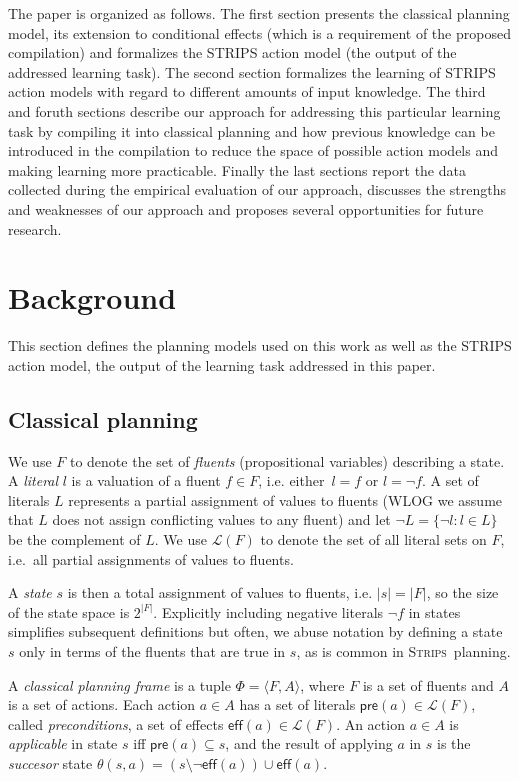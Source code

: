 \documentclass[letterpaper]{article} %
\newcommand{\tup}[1]{{\langle #1 \rangle}}
\newcommand{\pre}{\mathsf{pre}}     %
\newcommand{\eff}{\mathsf{eff}}     %
\newcommand{\strips}{\textsc{Strips}}     %
\begin{document}
The paper is organized as follows. The first section presents the classical planning model, its extension to conditional effects (which is a requirement of the proposed compilation) and formalizes the STRIPS action model (the output of the addressed learning task). The second section formalizes the learning of STRIPS action models with regard to different amounts of input knowledge. The third and foruth sections describe our approach for addressing this particular learning task by compiling it into classical planning and how previous knowledge can be introduced in the compilation to reduce the space of possible action models and making learning more practicable. Finally the last sections report the data collected during the empirical evaluation of our approach, discusses the strengths and weaknesses of our approach and proposes several opportunities for future research. 
 

\section{Background}
This section defines the planning models used on this work as well as the STRIPS action model, the output of the learning task addressed in this paper.

\subsection{Classical planning}
We use $F$ to denote the set of {\em fluents} (propositional variables) describing a state. A {\em literal} $l$ is a valuation of a fluent $f\in F$, i.e. either~$l=f$ or $l=\neg f$. A set of literals $L$ represents a partial assignment of values to fluents (WLOG we assume that $L$ does not assign conflicting values to any fluent) and let $\neg L=\{\neg l:l\in L\}$ be the complement of $L$. We use $\mathcal{L}(F)$ to denote the set of all literal sets on $F$, i.e.~all partial assignments of values to fluents.

A {\em state} $s$ is then a total assignment of values to fluents, i.e. $|s|=|F|$, so the size of the state space is $2^{|F|}$. Explicitly including negative literals $\neg f$ in states simplifies subsequent definitions but often, we abuse notation by defining a state $s$ only in terms of the fluents that are true in $s$, as is common in \strips\ planning.

A {\em classical planning frame} is a tuple $\Phi=\tup{F,A}$, where $F$ is a set of fluents and $A$ is a set of actions. Each action $a\in A$ has a set of literals $\pre(a)\in\mathcal{L}(F)$, called {\em preconditions}, a set of effects $\eff(a)\in\mathcal{L}(F)$. An action $a\in A$ is {\em applicable} in state $s$ iff $\pre(a)\subseteq s$, and the result of applying $a$ in $s$ is the {\em succesor} state $\theta(s,a)=(s\setminus \neg\eff(a))\cup\eff(a)$.
\end{document}
